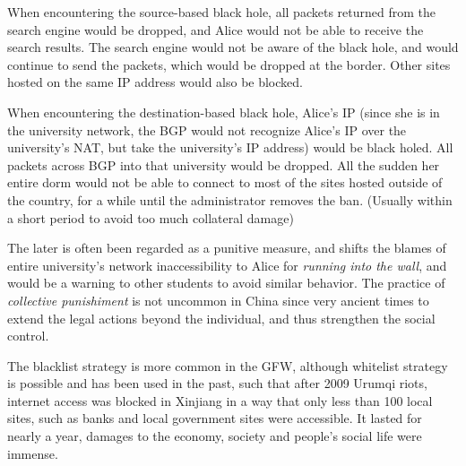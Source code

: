 \documentclass[nonacm,sigplan,screen]{acmart}
\begin{document}
When encountering the source-based black hole, all packets returned from
the search engine would be dropped, and Alice would not be able to
receive the search results. The search engine would not be aware of the
black hole, and would continue to send the packets, which would be
dropped at the border. Other sites hosted on the same IP address would
also be blocked.

When encountering the destination-based black hole, Alice's IP (since
she is in the university network, the BGP would not recognize Alice's IP
over the university's NAT, but take the university's IP address) would
be black holed. All packets across BGP into that university would be
dropped. All the sudden her entire dorm would not be able to connect to
most of the sites hosted outside of the country, for a while until the
administrator removes the ban. (Usually within a short period to avoid
too much collateral damage)

The later is often been regarded as a punitive measure, and shifts the
blames of entire university's network inaccessibility to Alice for
\emph{running into the wall}, and would be a warning to other students
to avoid similar behavior. The practice of \emph{collective punishiment}
is not uncommon in China since very ancient times to extend the legal
actions beyond the individual, and thus strengthen the social control.
\cite{17_earlyChina}

The blacklist strategy is more common in the GFW, although whitelist
strategy is possible and has been used in the past, such that after 2009
Urumqi riots, internet access was blocked in Xinjiang in a way that only
less than 100 local sites, such as banks and local government sites were
accessible. \cite{10_missingLink} It lasted for nearly a year,
\cite{11_xinjiang} damages to the economy, society and people's social
life were immense.

\end{document}
